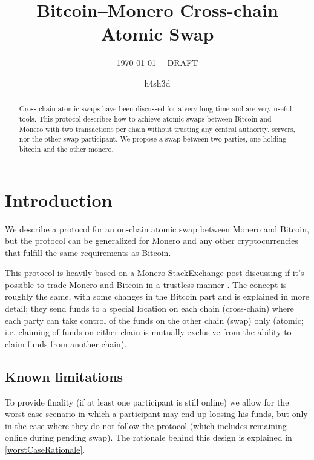 \documentclass{llncs}
\begin{document}
\title{Bitcoin--Monero Cross-chain Atomic Swap}
\author{h4sh3d}

\subtitle{{\normalsize\today{\small\ -- DRAFT}}}

\maketitle

\begin{abstract}
    Cross-chain atomic swaps have been discussed for a very long time and are very useful tools. This protocol describes how to achieve atomic swaps between Bitcoin and Monero with two transactions per chain without trusting any central authority, servers, nor the other swap participant. We propose a swap between two parties, one holding bitcoin and the other monero.
\end{abstract}

\section{Introduction}
We describe a protocol for an on-chain atomic swap between Monero and Bitcoin, but the protocol can be generalized for Monero and any other cryptocurrencies that fulfill the same requirements as Bitcoin.

This protocol is heavily based on a Monero StackExchange post discussing if it's possible to trade Monero and Bitcoin in a trustless manner \cite{MoneroStackexchangeSwap}. The concept is roughly the same, with some changes in the Bitcoin part and is explained in more detail; they send funds to a special location on each chain (cross-chain) where each party can take control of the funds on the other chain (swap) only (atomic; i.e. claiming of funds on either chain is mutually exclusive from the ability to claim funds from another chain).

\subsection{Known limitations}
To provide finality (if at least one participant is still online) we allow for the worst case scenario in which a participant may end up loosing his funds, but only in the case where they do not follow the protocol (which includes remaining online during pending swap). The rationale behind this design is explained in \ref{worstCaseRationale}.
\end{document}
